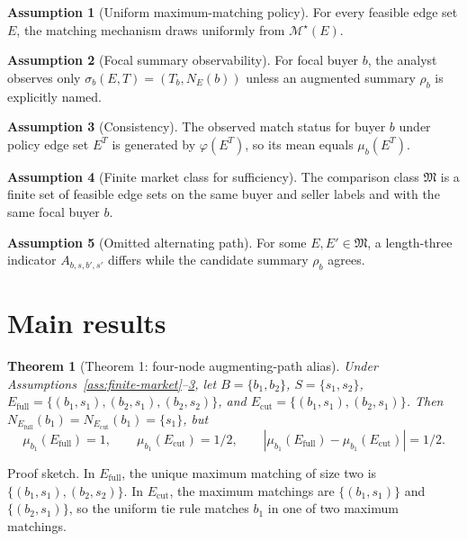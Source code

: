 \documentclass[11pt]{article}
\theoremstyle{definition}
\newtheorem{assumption}{Assumption}
\theoremstyle{plain}
\newtheorem{theorem}{Theorem}
\theoremstyle{remark}
\begin{document}
\begin{assumption}[Uniform maximum-matching policy]\label{ass:uniform-policy}
For every feasible edge set $E$, the matching mechanism draws uniformly from $\mathcal M^\star(E)$.
\end{assumption}

\begin{assumption}[Focal summary observability]\label{ass:focal-summary}
For focal buyer $b$, the analyst observes only $\sigma_b(E,T)=(T_b,N_E(b))$ unless an augmented summary $\rho_b$ is explicitly named.
\end{assumption}

\begin{assumption}[Consistency]\label{ass:consistency}
The observed match status for buyer $b$ under policy edge set $E^T$ is generated by $\varphi(E^T)$, so its mean equals $\mu_b(E^T)$.
\end{assumption}

\begin{assumption}[Finite market class for sufficiency]\label{ass:finite-class}
The comparison class $\mathfrak M$ is a finite set of feasible edge sets on the same buyer and seller labels and with the same focal buyer $b$.
\end{assumption}

\begin{assumption}[Omitted alternating path]\label{ass:omitted-path}
For some $E,E'\in\mathfrak M$, a length-three indicator $A_{b,s,b',s'}$ differs while the candidate summary $\rho_b$ agrees.
\end{assumption}

\section{Main results}
\begin{theorem}[Theorem 1: four-node augmenting-path alias]\label{thm:four-node-alias}
Under Assumptions~\ref{ass:finite-market}--\ref{ass:consistency}, let $B=\{b_1,b_2\}$, $S=\{s_1,s_2\}$, $E_{\mathrm{full}}=\{(b_1,s_1),(b_2,s_1),(b_2,s_2)\}$, and $E_{\mathrm{cut}}=\{(b_1,s_1),(b_2,s_1)\}$. Then $N_{E_{\mathrm{full}}}(b_1)=N_{E_{\mathrm{cut}}}(b_1)=\{s_1\}$, but
\[
  \mu_{b_1}(E_{\mathrm{full}})=1,\qquad
  \mu_{b_1}(E_{\mathrm{cut}})=1/2,\qquad
  |\mu_{b_1}(E_{\mathrm{full}})-\mu_{b_1}(E_{\mathrm{cut}})|=1/2.
\]
\end{theorem}

Proof sketch. In $E_{\mathrm{full}}$, the unique maximum matching of size two is $\{(b_1,s_1),(b_2,s_2)\}$. In $E_{\mathrm{cut}}$, the maximum matchings are $\{(b_1,s_1)\}$ and $\{(b_2,s_1)\}$, so the uniform tie rule matches $b_1$ in one of two maximum matchings.
\end{document}
